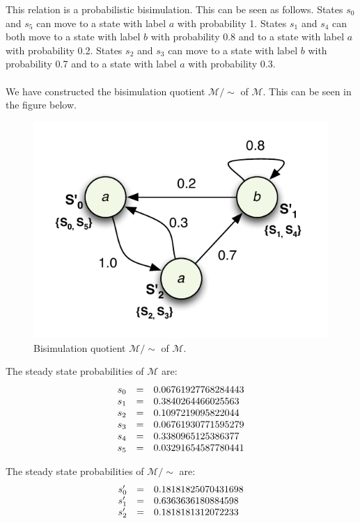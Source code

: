 \documentclass[12pt]{report}
\begin{document}
This relation is a probabilistic bisimulation. This can be seen as follows. States $s_0$ and $s_5$ can move to a state with label $a$ with probability 1. States $s_1$ and $s_4$ can both move to a state with label $b$ with probability 0.8 and to a state with label $a$ with probability 0.2. States $s_2$ and $s_3$ can move to a state with label $b$ with probability 0.7 and to a state with label $a$ with probability 0.3.\\
\\
We have constructed the bisimulation quotient $\mathcal{M} / \sim$ of $\mathcal{M}$. This can be seen in the figure below.
\begin{figure}[H]
	\begin{center}
		\includegraphics[scale=.85]{../GFX/Answer-B2-2b.pdf}
	\end{center}
	\caption{Bisimulation quotient $\mathcal{M} / \sim$ of $\mathcal{M}$.}
	\label{fig:b22b}
\end{figure}

The steady state probabilities of $\mathcal{M}$ are:
$$\begin{array}{l c l}
	s_0 & = & 0.06761927768284443\\
	s_1 & = & 0.3840264466025563\\
	s_2 & = & 0.1097219095822044\\
	s_3 & = & 0.06761930771595279\\
	s_4 & = & 0.3380965125386377\\
	s_5 & = & 0.03291654587780441
\end{array}$$

The steady state probabilities of $\mathcal{M} / \sim$ are:
$$\begin{array}{l c l}
	s'_0 & = & 0.18181825070431698\\
	s'_1 & = & 0.6363636180884598\\
	s'_2 & = & 0.1818181312072233
\end{array}$$
\end{document}

